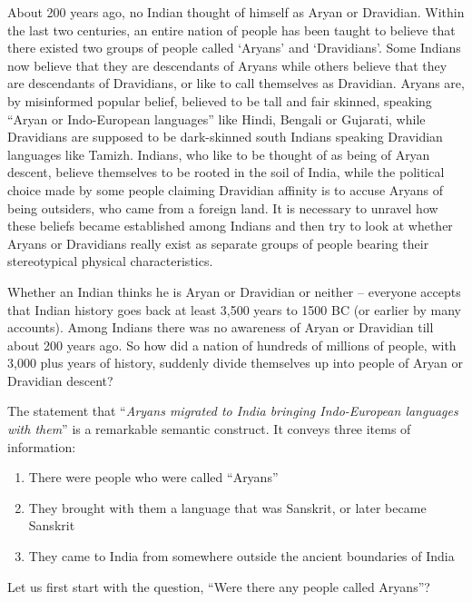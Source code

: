 About 200 years ago, no Indian thought of himself as Aryan or Dravidian. Within the last two centuries, an entire nation of people has been taught to believe that there existed two groups of people called ‘Aryans’ and ‘Dravidians’. Some Indians now believe that they are descendants of Aryans while others believe that they are descendants of Dravidians, or like to call themselves as Dravidian. Aryans are, by misinformed popular belief, believed to be tall and fair skinned, speaking “Aryan or Indo-European languages” like Hindi, Bengali or Gujarati, while Dravidians are supposed to be dark-skinned south Indians speaking Dravidian languages like Tamizh. Indians, who like to be thought of as being of Aryan descent, believe themselves to be rooted in the soil of India, while the political choice made by some people claiming Dravidian affinity is to accuse Aryans of being outsiders, who came from a foreign land. It is necessary to unravel how these beliefs became established among Indians and then try to look at whether Aryans or Dravidians really exist as separate groups of people bearing their stereotypical physical characteristics.

Whether an Indian thinks he is Aryan or Dravidian or neither – everyone accepts that Indian history goes back at least 3,500 years to 1500 BC (or earlier by many accounts). Among Indians there was no awareness of Aryan or Dravidian till about 200 years ago. So how did a nation of hundreds of millions of people, with 3,000 plus years of history, suddenly divide themselves up into people of Aryan or Dravidian descent?

The statement that “\textit{Aryans migrated to India bringing Indo-European languages with them}” is a remarkable semantic construct. It conveys three items of information:

\begin{enumerate}[{\rm 1)}]
\itemsep=0pt
\item There were people who were called “Aryans”

 \item They brought with them a language that was Sanskrit, or later became Sanskrit

 \item They came to India from somewhere outside the ancient boundaries of India

\end{enumerate}

Let us first start with the question, “Were there any people called Aryans”?

